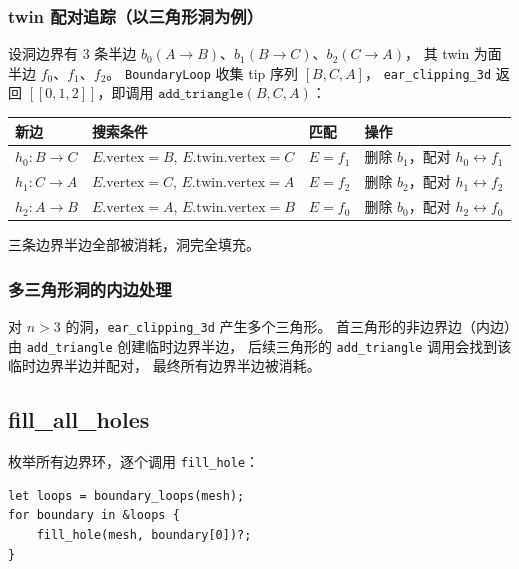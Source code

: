 \documentclass[11pt,a4paper]{article}
\begin{document}
\subsubsection{twin 配对追踪（以三角形洞为例）}

设洞边界有 3 条半边 $b_0(A \to B)$、$b_1(B \to C)$、$b_2(C \to A)$，
其 twin 为面半边 $f_0$、$f_1$、$f_2$。
\texttt{BoundaryLoop} 收集 tip 序列 $[B, C, A]$，
\texttt{ear\_clipping\_3d} 返回 $[[0, 1, 2]]$，即调用
$\texttt{add\_triangle}(B, C, A)$：

\begin{center}
\renewcommand{\arraystretch}{1.18}
\begin{tabular}{@{}llll@{}}
  \toprule
  \textbf{新边} & \textbf{搜索条件} & \textbf{匹配} & \textbf{操作} \\
  \midrule
  $h_0\!: B \to C$ & $E.\text{vertex}=B$, $E.\text{twin}.\text{vertex}=C$ & $E = f_1$ & 删除 $b_1$，配对 $h_0 \leftrightarrow f_1$ \\
  $h_1\!: C \to A$ & $E.\text{vertex}=C$, $E.\text{twin}.\text{vertex}=A$ & $E = f_2$ & 删除 $b_2$，配对 $h_1 \leftrightarrow f_2$ \\
  $h_2\!: A \to B$ & $E.\text{vertex}=A$, $E.\text{twin}.\text{vertex}=B$ & $E = f_0$ & 删除 $b_0$，配对 $h_2 \leftrightarrow f_0$ \\
  \bottomrule
\end{tabular}
\end{center}

三条边界半边全部被消耗，洞完全填充。

\subsubsection{多三角形洞的内边处理}

对 $n > 3$ 的洞，\texttt{ear\_clipping\_3d} 产生多个三角形。
首三角形的非边界边（内边）由 \texttt{add\_triangle} 创建临时边界半边，
后续三角形的 \texttt{add\_triangle} 调用会找到该临时边界半边并配对，
最终所有边界半边被消耗。

\subsection{fill\_all\_holes}

枚举所有边界环，逐个调用 \texttt{fill\_hole}：

\begin{lstlisting}
let loops = boundary_loops(mesh);
for boundary in &loops {
    fill_hole(mesh, boundary[0])?;
}
\end{lstlisting}
\end{document}
